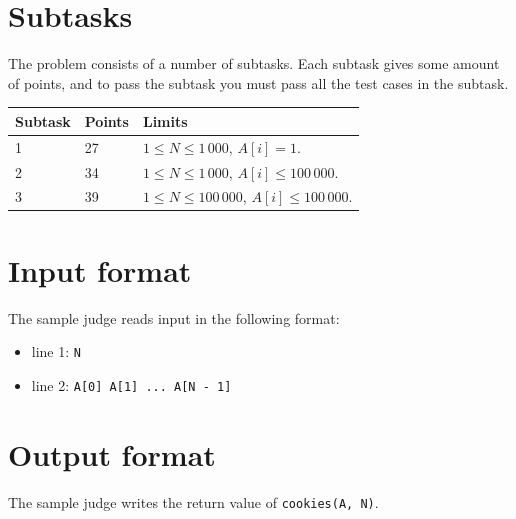 \section*{Subtasks}
The problem consists of a number of subtasks. Each subtask gives some amount of points, and to pass
the subtask you must pass all the test cases in the subtask.

\begin{tabular}{|l|l|l|}
  \hline
  \textbf{Subtask} & \textbf{Points} & \textbf{Limits} \\ \hline
  1 & 27 & $1 \le N \le 1\,000$,  $A[i] = 1$. \\ \hline
  2 & 34 & $1 \le N \le 1\,000$,  $A[i] \le 100\,000$. \\ \hline
  3 & 39 & $1 \le N \le 100\,000$,  $A[i] \le 100\,000$. \\ \hline
\end{tabular}

\section*{Input format}
The sample judge reads input in the following format:

\begin{itemize}
  \item line 1: \texttt{N}
  \item line 2: \texttt{A[0] A[1] ... A[N - 1]}
\end{itemize}

\section*{Output format}
The sample judge writes the return value of \texttt{cookies(A, N)}.
